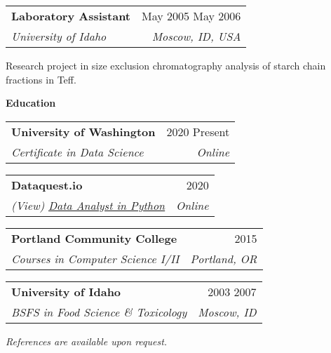 \documentclass[letterpaper,12pt]{article}[leftmargin=*]
\makeatletter
\def\entryspacing{-0pt}
\newcommand{\education}[2]{\vspace{6pt}
  \colorbox{Copper}{\color{white}#1\hspace{9pt}\raggedbottom\normalsize\textbf{#2\hspace{4pt}}}
}
\newcommand{\resumeEntryStart}{\begin{itemize}[leftmargin=2.5mm]}
\newcommand{\resumeEntryEnd}{\end{itemize}\vspace{\entryspacing}}
\newcommand{\resumeItemListStart}{\begin{itemize}[leftmargin=4.5mm]}
\newcommand{\resumeItemListEnd}{\end{itemize}}
\newcommand{\resumeItem}[1]{
  \item\small{
    {#1 \vspace{-2pt}}
  }
}
\newcommand{\resumeEntryTSDL}[4]{
  \vspace{-1pt}\item[]
    \begin{tabularx}{0.97\textwidth}{X@{\hspace{60pt}}r}
      \textbf{\color{primary}#1} & {\firabook\color{accent}\small#2} \\
      \textit{\color{accent}\small#3} & \textit{\color{accent}\small#4} \\
    \end{tabularx}\vspace{-6pt}
}
\makeatother
\begin{document}
\resumeEntryStart{
  \resumeEntryTSDL{Laboratory Assistant}{May 2005 \textemdash{} May 2006}{University of Idaho}{Moscow, ID, USA}
  \resumeItemListStart{
    \resumeItem{Research project in size exclusion chromatography analysis of starch chain fractions in Teff.}}
  \resumeItemListEnd{}}
\resumeEntryEnd{}

\education{\faGraduationCap}{Education}

\resumeEntryStart{
  \resumeEntryTSDL{University of Washington}{2020 \textemdash{} Present}{Certificate in Data Science}{Online}
  \resumeEntryTSDL{Dataquest.io}{2020}{(View) \href{https://app.dataquest.io/view_cert/G76HQZAT7X8UQNXKR3LR/}{\underline{Data Analyst in Python}}}{Online}
  \resumeEntryTSDL{Portland Community College}{2015}{Courses in Computer Science I/II}{Portland, OR}
  \resumeEntryTSDL{University of Idaho}{2003 \textemdash{} 2007}{BSFS in Food Science \& Toxicology}{Moscow, ID}}
\resumeEntryEnd{}

\bigskip
\begin{center}
  \color{accent}\small{\textit{References are available upon request.}}
\end{center}
\end{document}
